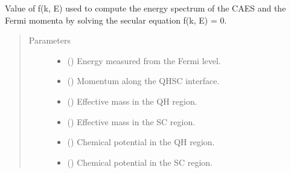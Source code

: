 \documentclass[letterpaper,10pt,english]{sphinxmanual}
\begin{document}

\begin{fulllineitems}
\label{\detokenize{modules:modules.functions.secular_equation}}
\pysigstartsignatures
{}
\pysigstopsignatures
\sphinxAtStartPar
Value of f(k, E) used to compute the energy spectrum of the CAES
and the Fermi momenta by solving the secular equation f(k, E) = 0.
\begin{quote}\begin{description}
\item[{Parameters}] \leavevmode\begin{itemize}
\item {} 
\sphinxAtStartPar
{} () \textendash{} Energy measured from the Fermi level.

\item {} 
\sphinxAtStartPar
{} () \textendash{} Momentum along the QH\sphinxhyphen{}SC interface.

\item {} 
\sphinxAtStartPar
{} () \textendash{} Effective mass in the QH region.

\item {} 
\sphinxAtStartPar
{} () \textendash{} Effective mass in the SC region.

\item {} 
\sphinxAtStartPar
{} () \textendash{} Chemical potential in the QH region.

\item {} 
\sphinxAtStartPar
{} () \textendash{} Chemical potential in the SC region.


\end{itemize}
\end{description}
\end{quote}
\end{fulllineitems}
\end{document}
